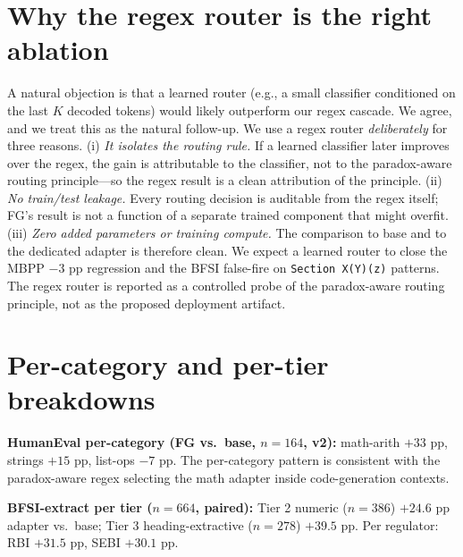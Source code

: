 \documentclass{article}
\begin{document}
\section{Why the regex router is the right ablation}
\label{app:regex}

A natural objection is that a learned router (e.g., a small classifier conditioned on the last $K$ decoded tokens) would likely outperform our regex cascade. We agree, and we treat this as the natural follow-up. We use a regex router \emph{deliberately} for three reasons. (i) \emph{It isolates the routing rule.} If a learned classifier later improves over the regex, the gain is attributable to the classifier, not to the paradox-aware routing principle---so the regex result is a clean attribution of the principle. (ii) \emph{No train/test leakage.} Every routing decision is auditable from the regex itself; FG's result is not a function of a separate trained component that might overfit. (iii) \emph{Zero added parameters or training compute.} The comparison to base and to the dedicated adapter is therefore clean. We expect a learned router to close the MBPP $-3$ pp regression and the BFSI false-fire on \texttt{Section X(Y)(z)} patterns. The regex router is reported as a controlled probe of the paradox-aware routing principle, not as the proposed deployment artifact.

\section{Per-category and per-tier breakdowns}
\label{app:breakdowns}

\textbf{HumanEval per-category (FG vs.\ base, $n=164$, v2):} math-arith $+33$ pp, strings $+15$ pp, list-ops $-7$ pp. The per-category pattern is consistent with the paradox-aware regex selecting the math adapter inside code-generation contexts.

\textbf{BFSI-extract per tier ($n=664$, paired):} Tier 2 numeric ($n=386$) $+24.6$ pp adapter vs.\ base; Tier 3 heading-extractive ($n=278$) $+39.5$ pp. Per regulator: RBI $+31.5$ pp, SEBI $+30.1$ pp.

\newpage

\end{document}
